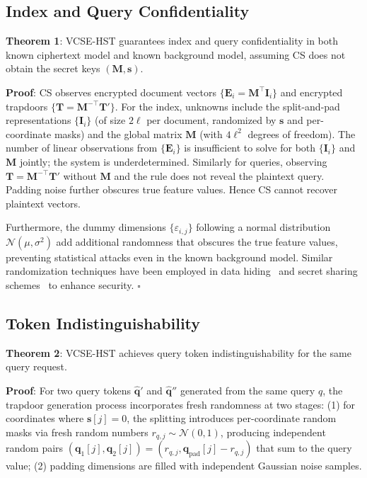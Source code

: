 \documentclass[journal]{IEEEtran}
\begin{document}
\subsection{Index and Query Confidentiality}

\textbf{Theorem 1}: VCSE-HST guarantees index and query confidentiality in both known ciphertext model and known background model, assuming CS does not obtain the secret keys $(\mathbf{M}, \mathbf{s})$.

\textbf{Proof}: CS observes encrypted document vectors $\{\mathbf{E}_i=\mathbf{M}^{\top}\mathbf{I}_i\}$ and encrypted trapdoors $\{\mathbf{T}=\mathbf{M}^{-\top}\mathbf{T}'\}$. For the index, unknowns include the split-and-pad representations $\{\mathbf{I}_i\}$ (of size $2\ell$ per document, randomized by $\mathbf{s}$ and per-coordinate masks) and the global matrix $\mathbf{M}$ (with $4\ell^2$ degrees of freedom). The number of linear observations from $\{\mathbf{E}_i\}$ is insufficient to solve for both $\{\mathbf{I}_i\}$ and $\mathbf{M}$ jointly; the system is underdetermined. Similarly for queries, observing $\mathbf{T}=\mathbf{M}^{-\top}\mathbf{T}'$ without $\mathbf{M}$ and the rule does not reveal the plaintext query. Padding noise further obscures true feature values. Hence CS cannot recover plaintext vectors.

Furthermore, the dummy dimensions $\{\varepsilon_{i,j}\}$ following a normal distribution $\mathcal{N}(\mu, \sigma^2)$ add additional randomness that obscures the true feature values, preventing statistical attacks even in the known background model. Similar randomization techniques have been employed in data hiding~\cite{zhang2012separable} and secret sharing schemes~\cite{shamir1979share} to enhance security. \hfill $\square$

\subsection{Token Indistinguishability}

\textbf{Theorem 2}: VCSE-HST achieves query token indistinguishability for the same query request.

\textbf{Proof}: For two query tokens $\widehat{\mathbf{q}}'$ and $\widehat{\mathbf{q}}''$ generated from the same query $q$, the trapdoor generation process incorporates fresh randomness at two stages: (1) for coordinates where $\mathbf{s}[j]=0$, the splitting introduces per-coordinate random masks via fresh random numbers $r_{q,j} \sim \mathcal{N}(0,1)$, producing independent random pairs $(\mathbf{q}_1[j], \mathbf{q}_2[j]) = (r_{q,j}, \mathbf{q}_{\text{pad}}[j] - r_{q,j})$ that sum to the query value; (2) padding dimensions are filled with independent Gaussian noise samples. 
\end{document}

